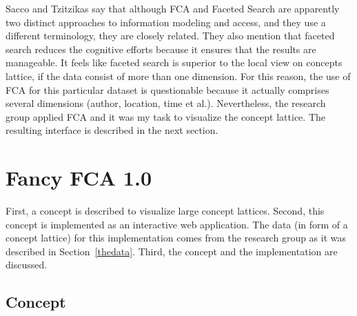\documentclass[11pt]{report}
\begin{document}
Sacco and Tzitzikas \cite{Sacco2009} say that although FCA and Faceted Search are apparently two distinct approaches to information modeling and access, and they use a different terminology, they are closely related. They also mention that faceted search reduces the cognitive efforts because it ensures that the results are manageable. It feels like faceted search is superior to the local view on concepts lattice, if the data consist of more than one dimension. For this reason, the use of FCA for this particular dataset is questionable because it actually comprises several dimensions (author, location, time et al.). Nevertheless, the research group applied FCA and it was my task to visualize the concept lattice. The resulting interface is described in the next section.

\chapter{Fancy FCA 1.0}
\label{Fancy 1.0}

First, a concept is described to visualize large concept lattices. Second, this concept is implemented as an interactive web application. The data (in form of a concept lattice) for this implementation comes from the research group as it was described in Section~\ref{thedata}. Third, the concept and the implementation are discussed.

\section{Concept}
\end{document}
